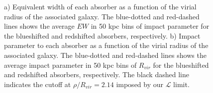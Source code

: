 \documentclass[iop]{emulateapj-rtx4}
\begin{document}
\begin{figure}[ht]
\centering
{}
\caption{\small{a) Equivalent width of each absorber as a function of the virial radius of the associated galaxy. The blue-dotted and red-dashed lines shows the average $EW$ in 50 kpc bins of impact parameter for the blueshifted and redshifted absorbers, respectively. b) Impact parameter to each absorber as a function of the virial radius of the associated galaxy. The blue-dotted and red-dashed lines shows the average impact parameter in 50 kpc bins of $R_{vir}$ for the blueshifted and redshifted absorbers, respectively. The black dashed line indicates the cutoff at $\rho/R_{vir} =2.14$ imposed by our $\mathcal{L}$ limit.}}
\vspace{5pt}
\end{figure}


\end{document}
